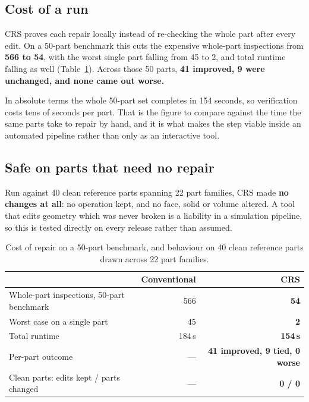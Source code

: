 \documentclass[10pt,onecolumn]{article}
\begin{document}
\subsection{Cost of a run}

CRS proves each repair locally instead of re-checking the whole part after every edit. On a 50-part
benchmark this cuts the expensive whole-part inspections from \textbf{566 to 54}, with the worst
single part falling from 45 to 2, and total runtime falling as well (Table~\ref{tab:cost}). Across
those 50 parts, \textbf{41 improved, 9 were unchanged, and none came out worse.}

In absolute terms the whole 50-part set completes in 154 seconds, so verification costs tens of
seconds per part. That is the figure to compare against the time the same parts take to repair by
hand, and it is what makes the step viable inside an automated pipeline rather than only as an
interactive tool.


\subsection{Safe on parts that need no repair}

Run against 40 clean reference parts spanning 22 part families, CRS made \textbf{no changes at
all}: no operation kept, and no face, solid or volume altered. A tool that edits geometry which was
never broken is a liability in a simulation pipeline, so this is tested directly on every release
rather than assumed.

\begin{table}[h]
\centering
\caption{Cost of repair on a 50-part benchmark, and behaviour on 40 clean reference parts drawn
across 22 part families.}
\label{tab:cost}
\footnotesize
\begin{tabularx}{\textwidth}{@{}X r r@{}}
\toprule
 & \textbf{Conventional} & \textbf{CRS}\\
\midrule
Whole-part inspections, 50-part benchmark & 566    & \textbf{54}\\
Worst case on a single part               & 45     & \textbf{2}\\
Total runtime                             & 184\,s & \textbf{154\,s}\\
Per-part outcome                          & ---    & \textbf{41 improved, 9 tied, 0 worse}\\
Clean parts: edits kept / parts changed   & ---    & \textbf{0 / 0}\\
\bottomrule
\end{tabularx}
\end{table}
\end{document}
